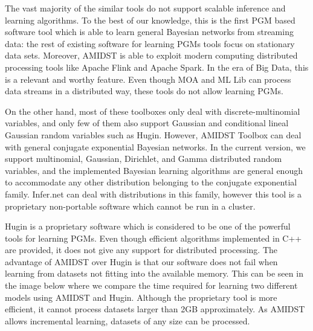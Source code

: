 \documentclass[10pt,a4paper]{article}
\begin{document}
The vast majority of the similar tools do not support scalable inference and learning algorithms. To the best of our knowledge, this is the first PGM based software tool which is able to learn general  Bayesian networks 
from streaming data:  the rest of existing software for learning PGMs tools focus on stationary data sets. Moreover, AMIDST is able to exploit modern computing distributed processing tools like Apache Flink and Apache Spark. In the era of Big Data, this is a relevant and worthy feature. Even though MOA and ML Lib can process data streams in a distributed way, these tools do not allow learning PGMs.  \newline 






On the other hand, most of these toolboxes only deal with discrete-multinomial variables, and only few of them also support Gaussian and conditional lineal Gaussian random variables such as Hugin. However, {AMIDST} Toolbox can deal with general conjugate exponential Bayesian networks. In the current version, we support multinomial, Gaussian, Dirichlet, and  Gamma distributed random variables, and the implemented Bayesian learning algorithms are general enough to accommodate any other distribution belonging to the conjugate exponential family. Infer.net can deal with distributions in this family, however this tool is a proprietary non-portable software which cannot be run in a cluster.\newline 



Hugin is a proprietary software which is considered to be one of the powerful tools for learning PGMs.  Even though efficient algorithms implemented in C++ are provided, it does not give any support for distributed processing. The advantage of AMIDST over Hugin is that our software does not fail when learning from datasets  not fitting into the available memory. This  can be seen in the image below where we compare the time required for learning two different models using AMIDST and Hugin. Although the proprietary tool is more efficient, it cannot process datasets larger than 2GB approximately. As AMIDST allows incremental learning, datasets of any size can be processed. 
\end{document}

